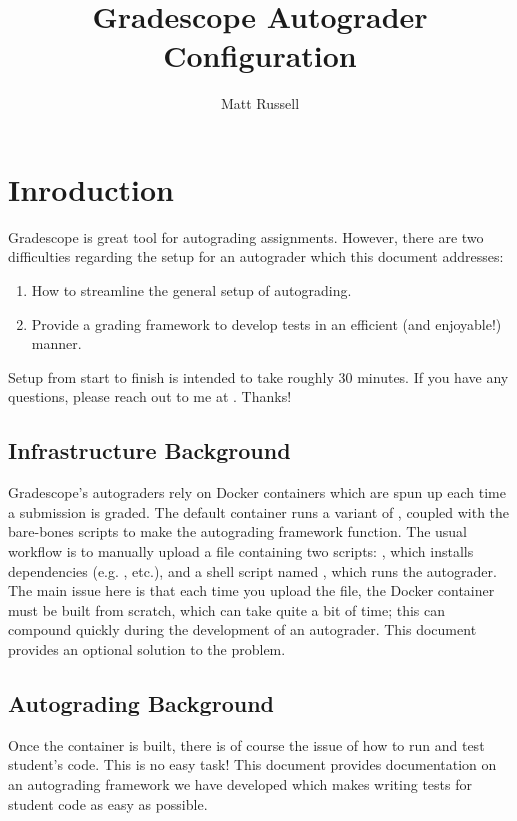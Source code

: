 \documentclass[11pt]{report}
\author{Matt Russell}
\title{Gradescope Autograder Configuration}
\begin{document}
\maketitle

\chapter*{Inroduction}
Gradescope is great tool for autograding assignments. However, there are two difficulties  
regarding the setup for an autograder which this document addresses:
\begin{enumerate}
      \item How to streamline the general setup of autograding.
      \item Provide a grading framework to develop tests in an efficient (and enjoyable!) manner.
\end{enumerate}
Setup from start to finish is intended to take roughly 30 minutes. If you have any questions, please reach out 
to me at . Thanks!

\section*{Infrastructure Background}
Gradescope's autograders rely on Docker containers which are spun up each time 
a submission is graded. The default container runs a variant of ,
coupled with the bare-bones scripts to make the autograding framework function. The usual 
workflow is to manually upload a  file containing two scripts: 
, which installs dependencies (e.g. , etc.), and a shell script 
named , which runs the autograder. The main issue here is that each time you 
upload the  file, the Docker container must be built from scratch, which can take quite
a bit of time; this can compound quickly during the development of an autograder. This document 
provides an optional solution to the problem. 

\section*{Autograding Background}
Once the container is built, there is of course the issue of how to run and test student's code. 
This is no easy task! This document provides documentation on an autograding framework we have 
developed which makes writing tests for student code as easy as possible. 
\end{document}
